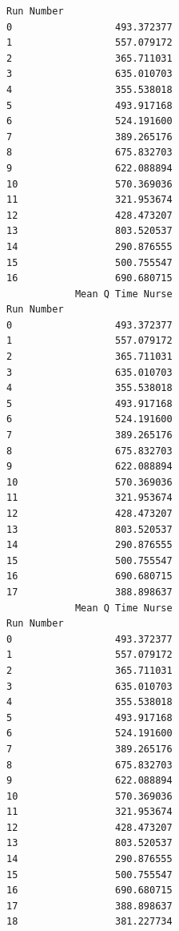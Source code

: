 \documentclass[
  letterpaper,
  DIV=11,
  numbers=noendperiod]{scrreprt}
\begin{document}
\begin{verbatim}
Run Number                   
0                  493.372377
1                  557.079172
2                  365.711031
3                  635.010703
4                  355.538018
5                  493.917168
6                  524.191600
7                  389.265176
8                  675.832703
9                  622.088894
10                 570.369036
11                 321.953674
12                 428.473207
13                 803.520537
14                 290.876555
15                 500.755547
16                 690.680715
            Mean Q Time Nurse
Run Number                   
0                  493.372377
1                  557.079172
2                  365.711031
3                  635.010703
4                  355.538018
5                  493.917168
6                  524.191600
7                  389.265176
8                  675.832703
9                  622.088894
10                 570.369036
11                 321.953674
12                 428.473207
13                 803.520537
14                 290.876555
15                 500.755547
16                 690.680715
17                 388.898637
            Mean Q Time Nurse
Run Number                   
0                  493.372377
1                  557.079172
2                  365.711031
3                  635.010703
4                  355.538018
5                  493.917168
6                  524.191600
7                  389.265176
8                  675.832703
9                  622.088894
10                 570.369036
11                 321.953674
12                 428.473207
13                 803.520537
14                 290.876555
15                 500.755547
16                 690.680715
17                 388.898637
18                 381.227734
\end{verbatim}
\end{document}
